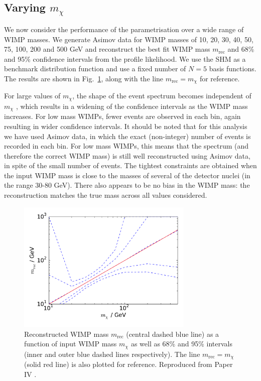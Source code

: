 \subsection{Varying $m_\chi$}
\label{sec:Poly:mass}

We now consider the performance of the parametrisation over a wide range of WIMP masses. We generate Asimov data for WIMP masses of 10, 20, 30, 40, 50, 75, 100, 200 and 500 GeV and reconstruct the best fit WIMP mass $m_\textrm{rec}$ and 68\% and 95\% confidence intervals from the profile likelihood. We use the SHM as a benchmark distribution function and use a fixed number of $N=5$ basis functions. The results are shown in Fig.~\ref{fig:Poly:VaryingM}, along with the line $m_\textrm{rec} = m_\chi$ for reference.

For large values of $m_\chi$, the shape of the event spectrum becomes independent of $m_\chi$ \cite{Green:2008}, which results in a widening of the confidence intervals as the WIMP mass increases. For low mass WIMPs, fewer events are observed in each bin, again resulting in wider confidence intervals. It should be noted that for this analysis we have used Asimov data, in which the exact (non-integer) number of events is recorded in each bin. For low mass WIMPs, this means that the spectrum (and therefore the correct WIMP mass) is still well reconstructed using Asimov data, in spite of the small number of events. The tightest constraints are obtained when the input WIMP mass is close to the masses of several of the detector nuclei (in the range 30-80 GeV). There also appears to be no bias in the WIMP mass: the reconstruction matches the true mass across all values considered.

\begin{figure}[t]
\centering
  \includegraphics[width=0.75\textwidth]{Poly/VaryingM.pdf}
  \caption[Reconstructed WIMP mass as a function of input WIMP mass for ideal experiments]{Reconstructed WIMP mass $m_\textrm{rec}$ (central dashed blue line) as a function of input WIMP mass $m_\chi$ as well as 68\% and 95\% intervals (inner and outer blue dashed lines respectively). The line $m_\textrm{rec} = m_\chi$ (solid red line) is also plotted for reference. Reproduced from Paper IV \cite{Kavanagh:2014}.}
  \label{fig:Poly:VaryingM}
\end{figure}




